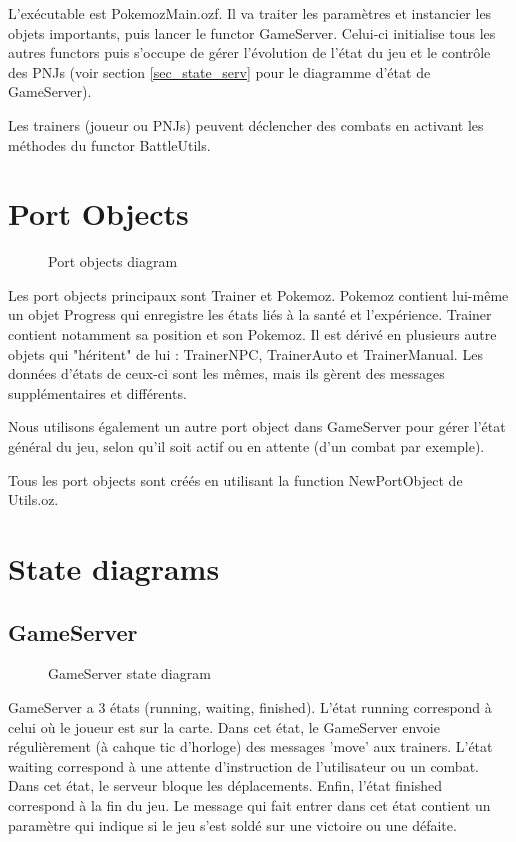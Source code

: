 \documentclass[a4paper,10pt]{article}
\begin{document}
L'exécutable est PokemozMain.ozf. Il va traiter les paramètres et instancier les objets importants, puis lancer le functor GameServer. Celui-ci initialise tous les autres functors puis s'occupe de gérer l'évolution de l'état du jeu et le contrôle des PNJs (voir section \ref{sec_state_serv} pour le diagramme d'état de GameServer).

Les trainers (joueur ou PNJs) peuvent déclencher des combats en activant les méthodes du functor BattleUtils.

\section{Port Objects}

\begin{figure}[!h]
	\caption{Port objects diagram}
\end{figure}

Les port objects principaux sont Trainer et Pokemoz. Pokemoz contient lui-même un objet Progress qui enregistre les états liés à la santé et l'expérience. Trainer contient notamment sa position et son Pokemoz. Il est dérivé en plusieurs autre objets qui "héritent" de lui : TrainerNPC, TrainerAuto et TrainerManual. Les données d'états de ceux-ci sont les mêmes, mais ils gèrent des messages supplémentaires et différents.

Nous utilisons également un autre port object dans GameServer pour gérer l'état général du jeu, selon qu'il soit actif ou en attente (d'un combat par exemple).

Tous les port objects sont créés en utilisant la function NewPortObject de Utils.oz.


\section{State diagrams}

\subsection{GameServer \label{sec_state_serv}}

\begin{figure}[!h]
	\label{state_serv}
	\caption{GameServer state diagram}
\end{figure}

GameServer a 3 états (running, waiting, finished). L'état running correspond à celui où le joueur est sur la carte. Dans cet état, le GameServer envoie régulièrement (à cahque tic d'horloge) des messages 'move' aux trainers. L'état waiting correspond à une attente d'instruction de l'utilisateur ou un combat. Dans cet état, le serveur bloque les déplacements. Enfin, l'état finished correspond à la fin du jeu. Le message qui fait entrer dans cet état contient un paramètre qui indique si le jeu s'est soldé sur une victoire ou une défaite.
\end{document}
